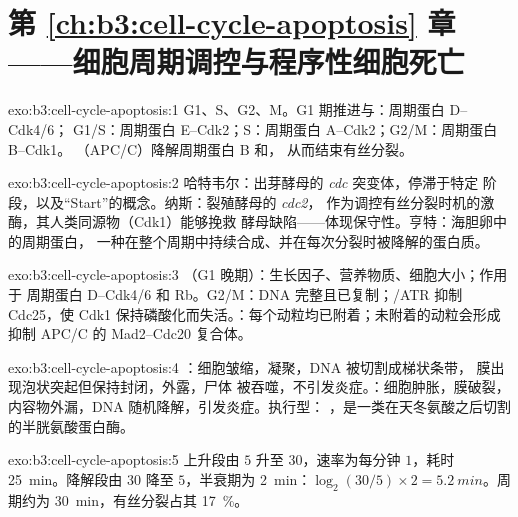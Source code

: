 \section*{第 \ref{ch:b3:cell-cycle-apoptosis} 章——细胞周期调控与程序性细胞死亡}

\begin{solution}{exo:b3:cell-cycle-apoptosis:1}
G1、S、G2、M。G1 期推进与：周期蛋白 D--Cdk4/6；
G1/S：周期蛋白 E--Cdk2；S：周期蛋白 A--Cdk2；G2/M：周期蛋白 B--Cdk1。
（APC/C）降解周期蛋白 B 和，
从而结束有丝分裂。
\end{solution}

\begin{solution}{exo:b3:cell-cycle-apoptosis:2}
哈特韦尔：出芽酵母的 \emph{cdc} 突变体，停滞于特定
阶段，以及“Start”的概念。纳斯：裂殖酵母的 \emph{cdc2}，
作为调控有丝分裂时机的激酶，其人类同源物（Cdk1）能够挽救
酵母缺陷——体现保守性。亨特：海胆卵中的周期蛋白，
一种在整个周期中持续合成、并在每次分裂时被降解的蛋白质。
\end{solution}

\begin{solution}{exo:b3:cell-cycle-apoptosis:3}
（G1 晚期）：生长因子、营养物质、细胞大小；作用于
周期蛋白 D--Cdk4/6 和 Rb。G2/M：DNA 完整且已复制；/ATR
抑制 Cdc25，使 Cdk1 保持磷酸化而失活。：每个动粒均已附着；未附着的动粒会形成
抑制 APC/C 的 Mad2--Cdc20 复合体。
\end{solution}

\begin{solution}{exo:b3:cell-cycle-apoptosis:4}
：细胞皱缩，凝聚，DNA 被切割成梯状条带，
膜出现泡状突起但保持封闭，外露，尸体
被吞噬，不引发炎症。：细胞肿胀，膜破裂，
内容物外漏，DNA 随机降解，引发炎症。执行型：
，是一类在天冬氨酸之后切割的半胱氨酸蛋白酶。
\end{solution}

\begin{solution}{exo:b3:cell-cycle-apoptosis:5}
上升段由 $5$ 升至 $30$，速率为每分钟 $1$，耗时 \qty{25}{min}。降解段由
$30$ 降至 $5$，半衰期为 \qty{2}{min}：$\log_{2}(30/5)\times 2 =
\qty{5.2}{min}$。周期约为 \qty{30}{min}，有丝分裂占其 \qty{17}{\%}。
\end{solution}


